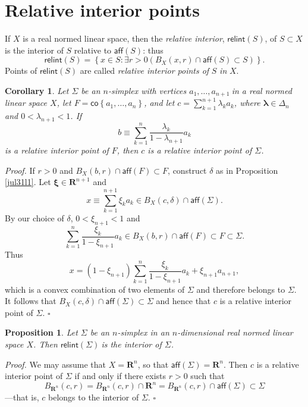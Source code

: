 \documentclass[11pt]{article}%
\newtheorem{corollary}[theorem]{Corollary}
\newtheorem{proposition}[theorem]{Proposition}
\newenvironment{proof}[1][Proof]{\noindent\textit{#1.} }{}
\begin{document}
\section{Relative interior points}

If $X$ is a real normed linear space, then the \emph{relative interior},
$\mathsf{relint}(S)$, of $S\subset X$ is the interior of $S$ relative to
$\mathsf{aff}(S)$: thus%
\[
\mathsf{relint}(S)=\left\{  x\in S:\exists r>0\left(  B_{X}(x,r)\cap
\mathsf{aff}(S)\subset S\right)  \right\}  .
\]
Points of $\mathsf{relint}(S)$ are called \emph{relative interior points of
}$S$ \emph{in }$X$.

\begin{corollary}
\label{aug01c1}Let $\Sigma$ be an $n$-simplex with vertices $a_{1}%
,\ldots,a_{n+1}\ $in a real normed linear space $X$, let $F=\mathsf{co}%
\left\{  a_{1},\ldots,a_{n}\right\}  $, and let $c=\sum_{k=1}^{n+1}\lambda
_{k}a_{k}$, where $\mathbf{\lambda}\in\Delta_{n}$ and $0<\lambda_{n+1}<1$. If%
\[
b\equiv\sum_{k=1}^{n}\frac{\lambda_{k}}{1-\lambda_{n+1}}a_{k}%
\]
is a relative interior point of $F$, then $c$ is a relative interior point of
$\Sigma$.
\end{corollary}

\begin{proof}
If $r>0$ and $B_{X}(b,r)\cap\mathsf{aff}(F)\subset F$, construct $\delta$ as
in Proposition \ref{jul31l1}. Let $\mathbf{\xi}\in\mathbf{R}^{n+1}$ and%
\[
x\equiv\sum_{k=1}^{n+1}\xi_{k}a_{k}\in B_{X}(c,\delta)\cap\mathsf{aff}%
(\Sigma).
\]
By our choice of $\delta$, $0<\xi_{n+1}<1$ and%
\[
\sum_{k=1}^{n}\frac{\xi_{k}}{1-\xi_{n+1}}a_{k}\in B_{X}(b,r)\cap
\mathsf{aff}(F)\subset F\subset\Sigma.
\]
Thus%
\[
x=\left(  1-\xi_{n+1}\right)  \sum_{k=1}^{n}\frac{\xi_{k}}{1-\xi_{n+1}}%
a_{k}+\xi_{n+1}a_{n+1},
\]
which is a convex combination of two elements of $\Sigma$ and therefore
belongs to $\Sigma$. It follows that $B_{X}(c,\delta)\cap\mathsf{aff}%
(\Sigma)\subset\Sigma$ and hence that $c$ is a relative interior point of
$\Sigma$.%
\hfill
$\square$
\end{proof}

\begin{proposition}
\label{sept09p1}Let $\Sigma$ be an $n$-simplex in an $n$-dimensional real
normed linear space $X$. Then $\mathsf{relint}(\Sigma)\ $is the interior of
$\Sigma$.
\end{proposition}

\begin{proof}
We may assume that $X=\mathbf{R}^{n}$, so that $\mathsf{aff}(\Sigma
)=\mathbf{R}^{n}$. Then $c$ is a relative interior point of $\Sigma$ if and
only if there exists $r>0$ such that%
\[
B_{\mathbf{R}^{n}}(c,r)=B_{\mathbf{R}^{n}}(c,r)\cap\mathbf{R}^{n}%
=B_{\mathbf{R}^{n}}(c,r)\cap\mathsf{aff}(\Sigma)\subset\Sigma
\]
---that is, $c$ belongs to the interior of $\Sigma$.%
\hfill
$\square$
\end{proof}
\end{document}
